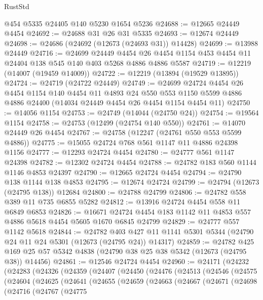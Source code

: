\begin{lexlean}{RustStd}
\begin{coremodule}
{\begin{coremodule}
{{{{{{{{{{{{{{{{{{{{{{{{{{{{{{{{{{{{{{{{{{{{{{{{{{{{{{{{{{{{{{{{{{{{{{{{{{{{{{{{    @454
    @5335
    @24405
    @140
    @5230
    @1654
    @5236
@24688 := @12665 @24449 @4454
@24692 := @24688 @31 @26 @31 @5335
@24693 := @12674 @24449
@24698 := @24686 (@24692 (@12673 (@24693 @31)) @14428)
@24699 := @13988 @24449
@24716 := @24699
    @24449
    @4454
    @26
    @4454
    @1154
    @453
    @4454
    @11
    @24404
    @138
    @545
    @140
    @403
    @5268
    @4886
    @4886
    @5587
@24719 := @12219 (@14007 (@19459 @14009))
@24722 := @12219 (@13894 (@19529 @13895))
@24724 := @24719 (@24722 @24449)
@24749 := @24699
    @24724
    @4454
    @26
    @4454
    @1154
    @140
    @4454
    @11
    @4893
    @24
    @550
    @553
    @1150
    @5599
    @4886
    @4886
    @24400
    (@14034 @24449 @4454 @26 @4454 @1154 @4454 @11)
@24750 := @14056 @1154
@24753 := @24749 (@14044 (@24750 @24))
@24754 := @19564 @1154
@24758 := @24753 (@12499 (@24754 @140 @550))
@24761 := @14070 @24449 @26 @4454
@24767 := @24758 (@12247 (@24761 @550 @553 @5599 @4886))
@24775 := @15055 @24724 @768 @561 @1147 @11 @4886 @24398 @1156
@24777 := @12293 @24724 @4454
@24780 := @24777 @561 @1147 @24398
@24782 := @12302 @24724 @4454
@24788 := @24782 @183 @560 @1144 @1146 @4853 @24397
@24790 := @12665 @24724 @4454
@24794 := @24790 @138 @1144 @138 @4853
@24795 := @12674 @24724
@24799 := @24794 (@12673 (@24795 @138)) @12684
@24800 := @24788 @24799
@24806 := @24782 @558 @389 @11 @735 @6855 @5282
@24812 := @13916 @24724 @4454 @558 @11 @6849 @6853
@24826 := @16671 @24724 @4454 @183 @1142 @11 @4853 @557 @4886 @5618 @4454 @5605 @1670 @6845 @24799
@24829 := @24777 @557 @1142 @5618
@24844 := @24782
    @403
    @427
    @11
    @1141
    @5301
    @5344
    (@24790 @24 @11 @24 @5301 (@12673 (@24795 @24)) @14317)
@24859 := @24782
    @425
    @169
    @25
    @57
    @5342
    @4838
    (@24790 @38 @25 @38 @5342 (@12673 (@24795 @38)) @14456)
@24861 := @12546 @24724 @4454
@24960 := @24171
    (@24232
      (@24283
        (@24326
          (@24359
            (@24407
              (@24450
                (@24476
                  (@24513
                    (@24546
                      (@24575
                        (@24604
                          (@24625
                            (@24641
                              (@24655
                                (@24659
                                  (@24663
                                    (@24667
                                      (@24671
                                        (@24698
                                          (@24716
                                            (@24767
                                              (@24775
}}}}}}}}}}}}}}}}}}}}}}}}}}}}}}}}}}}}}}}}}}}}}}}}}}}}}}}}}}}}}}}}}}}}}}}}}}}}}}}}
\end{coremodule}}
\end{coremodule}
\end{lexlean}
